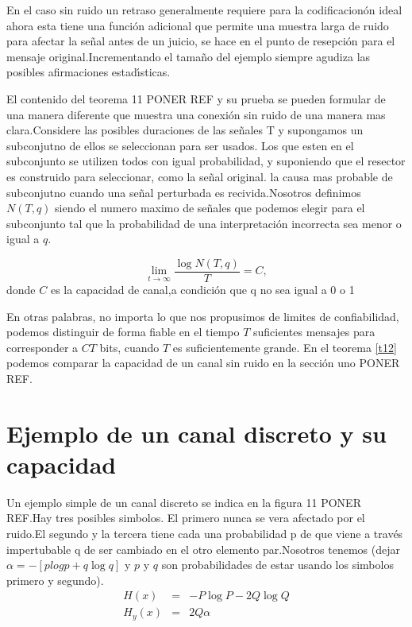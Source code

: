 En el caso sin ruido un retraso generalmente requiere para la
codificacion\'on ideal ahora esta tiene una funci\'on adicional que
permite una muestra larga de ruido para afectar la se\~{n}al antes de
un juicio, se hace en el punto de resepci\'on para el mensaje
original.Incrementando el tama\~{n}o del ejemplo siempre agudiza las
posibles afirmaciones estad\'{\i}sticas.

El contenido del teorema 11 PONER REF y su prueba se pueden formular
de una manera diferente que muestra una conexi\'on sin ruido de una
manera mas clara.Considere las posibles duraciones de las se\~{n}ales
T y supongamos un subconjutno de ellos se seleccionan para ser
usados. Los que esten en el subconjunto se utilizen todos con igual
probabilidad, y suponiendo que el resector es construido para
seleccionar, como la se\~{n}al original. la causa mas probable de
subconjutno cuando una se\~{n}al perturbada es recivida.Nosotros
definimos $N(T,q)$ siendo el numero maximo de se\~{n}ales que podemos
elegir para el subconjunto tal que la probabilidad de una
interpretaci\'{o}n incorrecta sea menor o igual a $q$.

\begin{theorem}
\begin{equation}
\displaystyle\lim_{t \to{}\infty}\frac{\log{N}(T,q)}{T} = C,
\end{equation}
donde $C$ es la capacidad de canal,a condici\'on que q no sea igual a
0 o 1
\label{t12}
\end{theorem}

En otras palabras, no importa lo que nos propusimos de limites de
confiabilidad, podemos distinguir de forma fiable en el tiempo $T$
suficientes mensajes para corresponder a $CT$ bits, cuando $T$ es
suficientemente grande. En el teorema \ref{t12} podemos comparar la
capacidad de un canal sin ruido en la secci\'on uno PONER REF.

\section{Ejemplo de un canal discreto y su capacidad}

Un ejemplo simple de un canal discreto se indica en la figura 11 PONER
REF.Hay tres posibles simbolos. El primero nunca se vera afectado por
el ruido.El segundo y la tercera tiene cada una probabilidad p de que
viene a trav\'es impertubable q de ser cambiado en el otro elemento
par.Nosotros tenemos (dejar $\alpha = -[plogp + q\log{q}]$ y $p$ y $q$
son probabilidades de estar usando los simbolos primero y segundo).
\begin{equation}
\begin{array}{rcl}
H(x) &=& -P\log{P} - 2Q\log{Q} \\
H_y(x) &=& 2Q\alpha
\end{array}
\end{equation}

